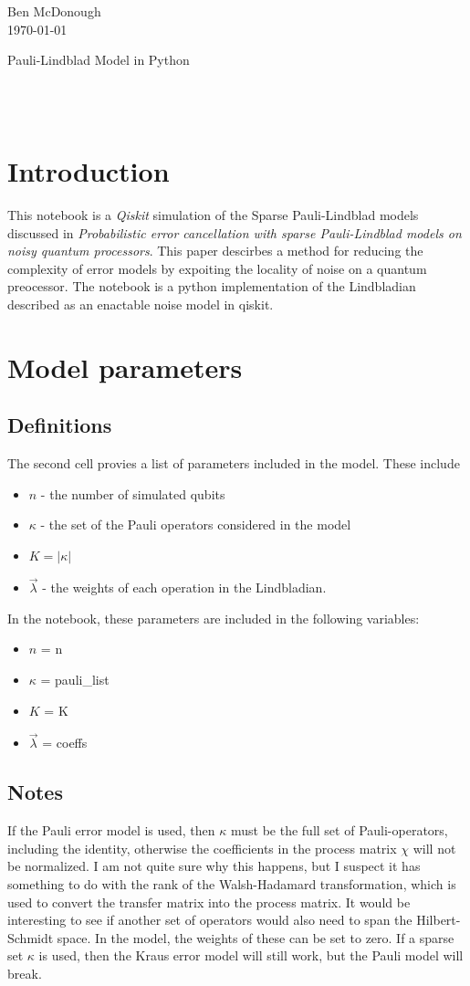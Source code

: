 \documentclass[11pt]{article}
\begin{document}
\thispagestyle{empty}
\noindent Ben McDonough\\
\noindent \today\\
\centerline{\huge Pauli-Lindblad Model in Python}\\ \\
\section*{Introduction}
This notebook is a \textit{Qiskit} simulation of the Sparse Pauli-Lindblad models discussed in \textit{Probabilistic error cancellation with sparse Pauli-Lindblad models on noisy quantum processors}. This paper descirbes a method for reducing the complexity of error models by expoiting the locality of noise on a quantum preocessor. The notebook is a python implementation of the Lindbladian described as an enactable noise model in qiskit.

\section{Model parameters}
\subsection*{Definitions}
The second cell provies a list of parameters included in the model. These include
\begin{itemize}
    \item $n$ - the number of simulated qubits
    \item $\kappa$ - the set of the Pauli operators considered in the model
    \item $K = |\kappa|$
    \item $\vec \lambda$ - the weights of each operation in the Lindbladian.
\end{itemize}
In the notebook, these parameters are included in the following variables:
\begin{itemize}
    \item $n$ = n
    \item $\kappa$ = pauli\_list
    \item $K$ = K
    \item $\vec \lambda$ = coeffs
\end{itemize}

\subsection*{Notes}
If the Pauli error model is used, then $\kappa$ must be the full set of Pauli-operators, including the identity, otherwise the coefficients in the process matrix $\chi$ will not be normalized. I am not quite sure why this happens, but I suspect it has something to do with the rank of the Walsh-Hadamard transformation, which is used to convert the transfer matrix into the process matrix. It would be interesting to see if another set of operators would also need to span the Hilbert-Schmidt space. In the model, the weights of these can be set to zero. If a sparse set $\kappa$ is used, then the Kraus error model will still work, but the Pauli model will break.
\end{document}
